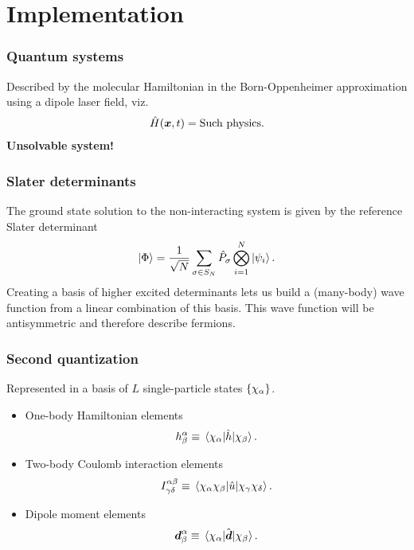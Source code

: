 \documentclass{beamer}
\begin{document}
\section{Implementation}

\begin{frame}
    \frametitle{Quantum systems}
    Described by the molecular Hamiltonian in the Born-Oppenheimer approximation
    using a dipole laser field, viz.
    \begin{align}
        \hat{H}(\boldsymbol{x}, t)
        = \text{Such physics}.
    \end{align}
    \textbf{Unsolvable system!}
\end{frame}

\begin{frame}
    \frametitle{Slater determinants}
    The ground state solution to the non-interacting system is given by the
    reference Slater determinant
    \begin{align}
        \ket{\Phi}
        = \frac{1}{\sqrt{N}}
        \sum_{\sigma \in S_N}
        \hat{P}_{\sigma}
        \bigotimes_{i = 1}^{N}
        \ket{\psi_i}.
    \end{align}
    Creating a basis of higher excited determinants lets us build a (many-body)
    wave function from a linear combination of this basis.
    This wave function will be antisymmetric and therefore describe fermions.
\end{frame}

\begin{frame}
    \frametitle{Second quantization}
    Represented in a basis of $L$ single-particle states $\left\{ \chi_{\alpha} \right\}$.
    \begin{itemize}
        \item One-body Hamiltonian elements
            \begin{align}
                h^{\alpha}_{\beta}
                \equiv \mel*{\chi_{\alpha}}{\hat{h}}{\chi_{\beta}}.
            \end{align}
        \item Two-body Coulomb interaction elements
            \begin{align}
                I^{\alpha\beta}_{\gamma\delta}
                \equiv
                \mel*{\chi_{\alpha}\chi_{\beta}}{
                    \hat{u}
                }{\chi_{\gamma}\chi_{\delta}}.
            \end{align}
        \item Dipole moment elements
            \begin{align}
                \boldsymbol{d}^{\alpha}_{\beta}
                \equiv
                \mel*{\chi_{\alpha}}{\hat{\boldsymbol{d}}}{\chi_{\beta}}.
            \end{align}
    \end{itemize}
\end{frame}
\end{document}
